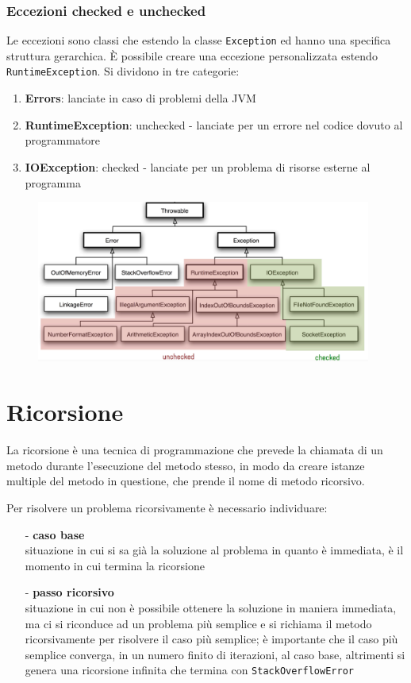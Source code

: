 \documentclass[a4paper]{article}
\begin{document}
\subsubsection*{Eccezioni checked e unchecked}
Le eccezioni sono classi che estendo la classe \verb|Exception| ed hanno una specifica struttura gerarchica. È possibile creare
una eccezione personalizzata estendo \verb|RuntimeException|. Si dividono in tre categorie:
\begin{enumerate} [topsep=3pt, itemsep=0pt]
	\item \textbf{Errors}: lanciate in caso di problemi della JVM
	\item \textbf{RuntimeException}: unchecked - lanciate per un errore nel codice dovuto al programmatore
	\item \textbf{IOException}: checked - lanciate per un problema di risorse esterne al programma
\end{enumerate}

\begin{figure}[h]
	\centering
	\includegraphics[width=11cm]{immagini/eccezioni.png}
\end{figure}

\newpage


\section{Ricorsione}
La ricorsione è una tecnica di programmazione che prevede la chiamata di un metodo durante l'esecuzione del metodo stesso, in modo
da creare istanze multiple del metodo in questione, che prende il nome di metodo ricorsivo.

Per risolvere un problema ricorsivamente è necessario individuare:
\begin{itemize} [topsep=3pt, itemsep=0pt]
	\item[-] \textbf{caso base} \\
	situazione in cui si sa già la soluzione al problema in quanto è immediata, è il momento in cui termina la ricorsione 
	\item[-] \textbf{passo ricorsivo} \\
	situazione in cui non è possibile ottenere la soluzione in maniera immediata, ma ci si riconduce ad un problema più semplice e
	si richiama il metodo ricorsivamente per risolvere il caso più semplice; è importante che il caso più semplice converga, in un
	numero finito di iterazioni, al caso base, altrimenti si genera una ricorsione infinita che termina con \verb|StackOverflowError|
\end{itemize}
\end{document}
